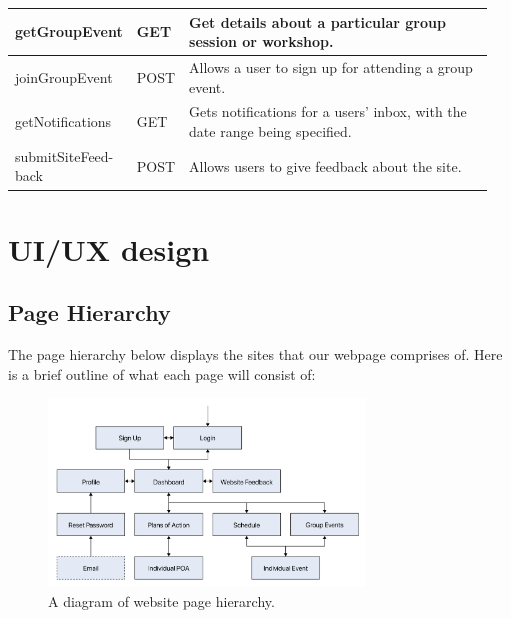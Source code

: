 \documentclass[10pt]{article}
\begin{document}
\begin{longtable}{|p{0.127\linewidth}|p{0.07\linewidth}|p{0.75\linewidth}|}
    getGroupEvent
    &
    GET
    &
    Get details about a particular group session or workshop.
    \\ \hline

    joinGroupEvent
    &
    POST
    &
    Allows a user to sign up for attending a group event.
    \\ \hline

    getNotifications
    &
    GET
    &
    Gets notifications for a users' inbox, with the date range being specified.
    \\ \hline

    submitSiteFeed- back
    &
    POST
    &
    Allows users to give feedback about the site.
    \\ \hline



\end{longtable}




\section{UI/UX design}

\subsection{Page Hierarchy}
The page hierarchy below displays the sites that our webpage comprises of. Here
is a brief outline of what each page will consist of:

\begin{figure}[H]
    \centering
    \includegraphics[width=0.75\textwidth]{Hierarchy}
    \caption{A diagram of website page hierarchy.}
    \label{fig:website_page_hierarchy}
\end{figure}
\end{document}
